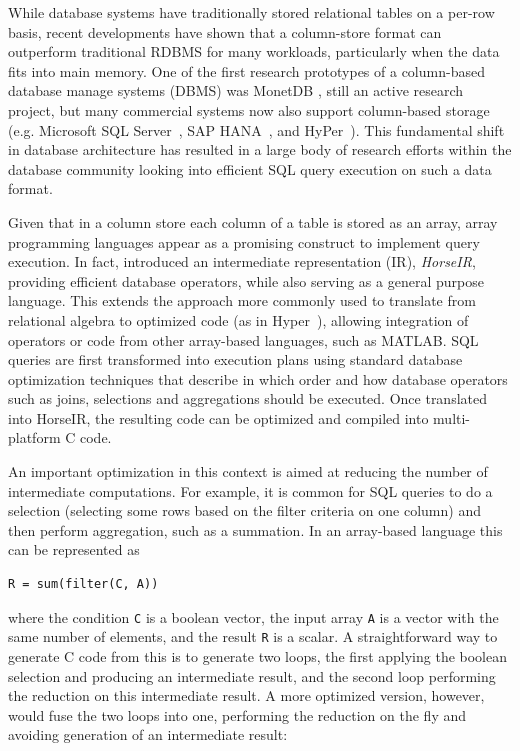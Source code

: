 While database systems have traditionally stored relational tables on a per-row
basis, recent developments have shown that a column-store format can outperform
traditional RDBMS for many workloads, particularly when the data fits into
main memory.
One of the first research prototypes of a column-based database manage systems
(DBMS) was MonetDB \cite{IdreosS2012}, still an active research project, but
many commercial systems now also support column-based storage (e.g.
Microsoft SQL Server~\cite{msqlserver},
SAP HANA~\cite{FarberF2012}, and
HyPer~\cite{Neumann2011:HyPer}).
This fundamental shift in database architecture has resulted in a large body of
research efforts within the database community looking into efficient SQL query
execution on such a data format.

Given that in a column store each column of a table is stored as an array,
array programming languages appear as a promising construct to implement query
execution. In fact, \OldPaperAuthor introduced an intermediate representation (IR),
\textit{HorseIR}, providing efficient database operators, while also serving as
a general purpose language.  This extends
the approach more commonly used to translate from relational algebra to optimized code (as in 
Hyper~\cite{Neumann2011:HyPer}), allowing integration of 
operators or code from other array-based languages, such as MATLAB.
SQL queries are first transformed into execution plans using standard database
optimization techniques that describe in which order and how database operators
such as joins, selections and aggregations should be executed.  Once translated
into HorseIR, the resulting code can be optimized and compiled into multi-platform
C code.

An important optimization in this context is aimed at reducing the number of intermediate
computations.
For example, it is common for SQL queries to do a selection (selecting some
rows based on the filter criteria on one column) and then perform aggregation,
such as a summation.  In an array-based language this can be represented as

\begin{small}
\begin{Verbatim}[xleftmargin=.3\columnwidth]
R = sum(filter(C, A))
\end{Verbatim}
\end{small}

\noindent{}where the condition \texttt{C} is a boolean vector, the input array \texttt{A}
is a vector with the same number of elements, and the result \texttt{R} is a
scalar.  A straightforward way to generate C code from this is to generate two loops, the first applying the boolean selection and producing an intermediate result, and the second loop performing the reduction on this intermediate result.  A more optimized version, however, would fuse the two loops into one, performing the reduction on the fly and avoiding generation of an intermediate result:

